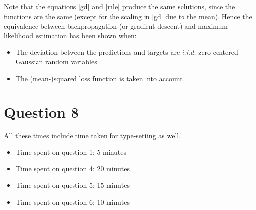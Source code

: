 \documentclass{article}
\begin{document}
\begin{flushleft}
Note that the equations \ref{gd} and \ref{mle} produce the same solutions, since the functions are the same (except for the scaling in \ref{gd} due to the mean). Hence the equivalence between backpropagation (or gradient descent) and maximum likelihood estimation has been shown when:
\begin{itemize}
\item The deviation between the predictions and targets are \textit{i.i.d.} zero-centered Gaussian random variables
\item The (mean-)squared loss function is taken into account.
\end{itemize}
\end{flushleft}

\section*{Question 8}
All these times include time taken for type-setting as well.
\begin{itemize}
\item Time spent on question 1: 5 minutes
\item Time spent on question 4: 20 minutes
\item Time spent on question 5: 15 minutes
\item Time spent on question 6: 10 minutes
\end{itemize}
\end{document}
